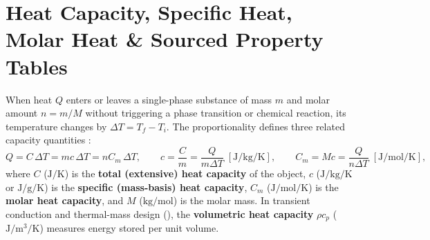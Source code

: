 \section{Heat Capacity, Specific Heat, Molar Heat \& Sourced Property Tables}
\label{sec:04.1}

When heat $Q$ enters or leaves a single-phase substance of mass $m$ and molar amount $n = m/M$ without triggering a phase transition or chemical reaction, its temperature changes by $\Delta T = T_f - T_i$. The proportionality defines three related capacity quantities :
\begin{equation}\label{eq:04:sensible}
  Q = C\,\Delta T = m c\,\Delta T = n C_m\,\Delta T, \qquad
  c = \frac{C}{m} = \frac{Q}{m\Delta T} \;\left[\si{\joule\per\kilogram\per\kelvin}\right], \qquad
  C_m = M c = \frac{Q}{n\Delta T} \;\left[\si{\joule\per\mole\per\kelvin}\right],
\end{equation}
where $C$ ($\si{\joule\per\kelvin}$) is the \textbf{total (extensive) heat capacity} of the object, $c$ ($\si{\joule\per\kilogram\per\kelvin}$ or $\si{\joule\per\gram\per\kelvin}$) is the \textbf{specific (mass-basis) heat capacity}, $C_m$ ($\si{\joule\per\mole\per\kelvin}$) is the \textbf{molar heat capacity}, and $M$ ($\si{\kilogram\per\mole}$) is the molar mass. In transient conduction and thermal-mass design (), the \textbf{volumetric heat capacity} $\rho c_p$ ($\si{\joule\per\cubic\meter\per\kelvin}$) measures energy stored per unit volume.

